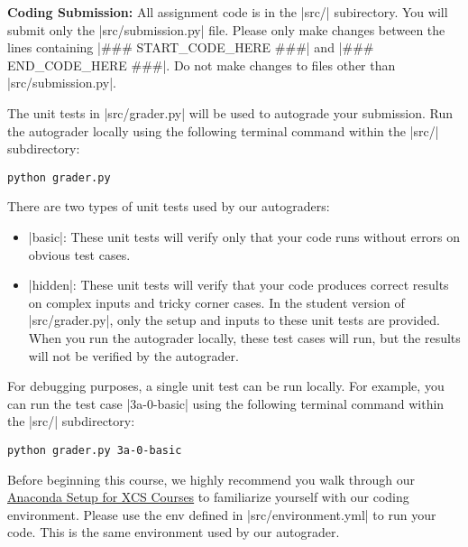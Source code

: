 {\bf Coding Submission:}
All assignment code is in the |src/| subirectory.  You will submit only the
|src/submission.py| file.  Please only make changes between the lines containing
|### START_CODE_HERE ###| and |### END_CODE_HERE ###|. Do not make changes to
files other than |src/submission.py|.

The unit tests in |src/grader.py| will be used to autograde your submission.
Run the autograder locally using the following terminal command within the
|src/| subdirectory:
\begin{lstlisting}
python grader.py
\end{lstlisting}

There are two types of unit tests used by our autograders:
\begin{itemize}
  \item |basic|:  These unit tests will verify only that your code runs without
  errors on obvious test cases.
  \item |hidden|: These unit tests will verify that your code produces correct
  results on complex inputs and tricky corner cases.  In the student version of
  |src/grader.py|, only the setup and inputs to these unit tests are provided.
  When you run the autograder locally, these test cases will run, but the
  results will not be verified by the autograder.
\end{itemize}

For debugging purposes, a single unit test can be run locally.  For example, you
can run the test case |3a-0-basic| using the following terminal command within
the |src/| subdirectory:
\begin{lstlisting}
python grader.py 3a-0-basic
\end{lstlisting}

Before beginning this course, we highly recommend you walk through our
\href{https://github.com/scpd-proed/General_Handouts/blob/master/Anaconda_Setup.pdf}{Anaconda
Setup for XCS Courses} to familiarize yourself with
our coding environment.  Please use the env defined in |src/environment.yml|
to run your code.  This is the same environment used by our autograder.
